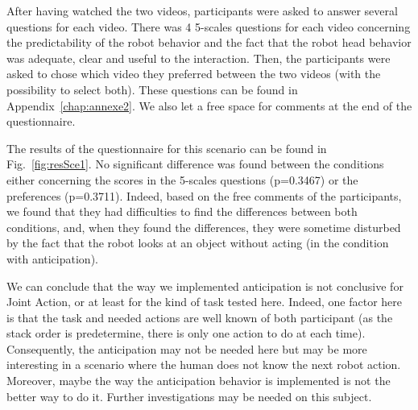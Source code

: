 \documentclass[english,a4paper,11pt,twoside]{StyleThese}
\begin{document}
After having watched the two videos, participants were asked to answer several questions for each video. There was 4 5-scales questions for each video concerning the predictability of the robot behavior and the fact that the robot head behavior was adequate, clear and useful to the interaction. Then, the participants were asked to chose which video they preferred between the two videos (with the possibility to select both). These questions can be found in Appendix~\ref{chap:annexe2}. We also let a free space for comments at the end of the questionnaire.

The results of the questionnaire for this scenario can be found in Fig.~\ref{fig:resSce1}. No significant difference was found between the conditions either concerning the scores in the 5-scales questions (p=0.3467) or the preferences (p=0.3711). Indeed, based on the free comments of the participants, we found that they had difficulties to find the differences between both conditions, and, when they found the differences, they were sometime disturbed by the fact that the robot looks at an object without acting (in the condition with anticipation). 

We can conclude that the way we implemented anticipation is not conclusive for Joint Action, or at least for the kind of task tested here. Indeed, one factor here is that the task and needed actions are well known of both participant (as the stack order is predetermine, there is only one action to do at each time). Consequently, the anticipation may not be needed here but may be more interesting in a scenario where the human does not know the next robot action. Moreover, maybe the way the anticipation behavior is implemented is not the better way to do it. Further investigations may be needed on this subject.
\end{document}
